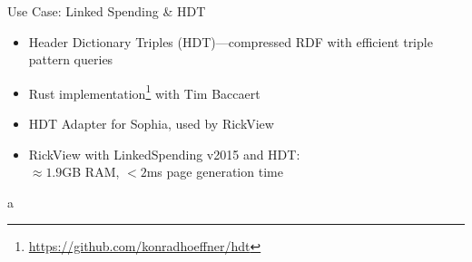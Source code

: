 \documentclass[14pt,aspectratio=169]{beamer}
\begin{document}
\begin{frame}{Use Case: Linked Spending \& HDT}
\begin{itemize}
\item Header Dictionary Triples (HDT)---compressed RDF with efficient triple pattern queries
\item Rust implementation\footnote{\url{https://github.com/konradhoeffner/hdt}} with Tim Baccaert
\item HDT Adapter for Sophia, used by RickView
\item RickView with LinkedSpending v2015 and HDT:\\$\approx 1.9$GB RAM,  $<2$ms page generation time
\end{itemize}
\end{frame}

\begin{frame}{}
\end{frame}

\begin{frame}{}
\end{frame}
a
\end{document}
